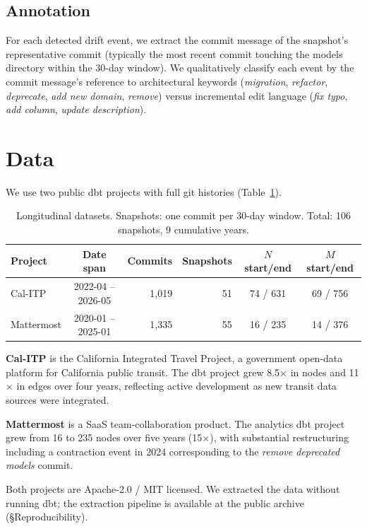 \documentclass[11pt,a4paper]{article}
\begin{document}
\subsection{Annotation}

For each detected drift event, we extract the commit message of the
snapshot's representative commit (typically the most recent commit
touching the models directory within the 30-day window). We
qualitatively classify each event by the commit message's reference
to architectural keywords (\textit{migration}, \textit{refactor},
\textit{deprecate}, \textit{add new domain}, \textit{remove}) versus
incremental edit language (\textit{fix typo}, \textit{add column},
\textit{update description}).

\section{Data}

We use two public dbt projects with full git histories
(Table~\ref{tab:data}).

\begin{table}[htb]
\centering
\small
\caption{Longitudinal datasets. Snapshots: one commit per 30-day window. Total: 106 snapshots, 9 cumulative years.}
\label{tab:data}
\begin{tabular}{lcrrcc}
\toprule
Project & Date span & Commits & Snapshots & $N$ start/end & $M$ start/end \\
\midrule
Cal-ITP & 2022-04 -- 2026-05 & 1{,}019 & 51 & 74 / 631 & 69 / 756 \\
Mattermost & 2020-01 -- 2025-01 & 1{,}335 & 55 & 16 / 235 & 14 / 376 \\
\bottomrule
\end{tabular}
\end{table}

\textbf{Cal-ITP} is the California Integrated Travel Project, a
government open-data platform for California public transit. The dbt
project grew 8.5$\times$ in nodes and 11$\times$ in edges over four
years, reflecting active development as new transit data sources
were integrated.

\textbf{Mattermost} is a SaaS team-collaboration product. The
analytics dbt project grew from 16 to 235 nodes over five years
(15$\times$), with substantial restructuring including a contraction
event in 2024 corresponding to the
\textit{remove deprecated models} commit.

Both projects are Apache-2.0 / MIT licensed. We extracted the data
without running dbt; the extraction pipeline is available at the
public archive (\S Reproducibility).
\end{document}
